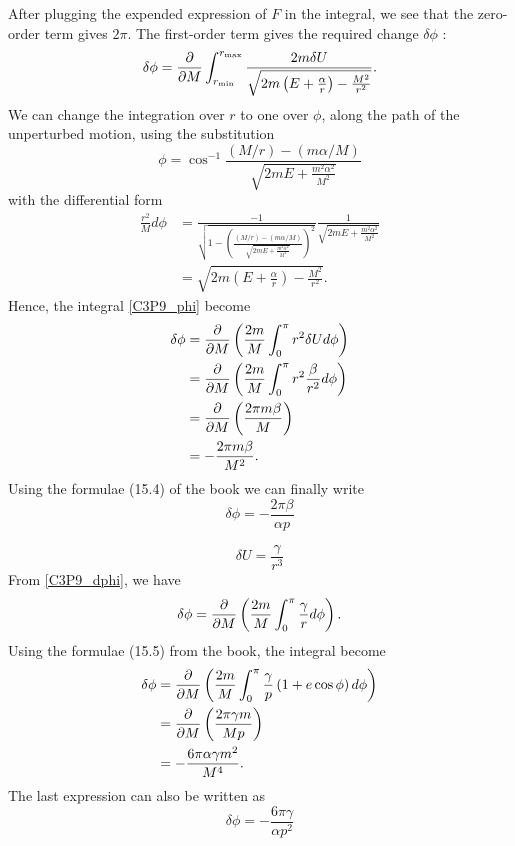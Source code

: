 \begin{subproblem}
{\begin{equation*}
\end{equation*}
After plugging the expended expression of $F$ in the integral, we see that the zero-order term gives $2\pi$. The first-order term gives the required change $\delta \phi$ :
\begin{equation} \label{C3P9_phi}
    \delta \phi = \frac{\partial }{\partial M}\int_{r_{\text{min}}}^{r_{\text{max}}} \frac{2m\delta U}{\sqrt{2m\left(E+\frac{\alpha}{r}\right)-\frac{M^2}{r^2}}}.
\end{equation}
We can change the integration over $r$ to one over $\phi$, along the path of the unperturbed motion, using the substitution
\begin{equation*}
    \phi = \cos^{-1}{\frac{(M/r)-(m\alpha/M)}{\sqrt{2mE+\frac{m^2\alpha^2}{M^2}}}}
\end{equation*}
with the differential form
\begin{align*}
    \frac{r^2}{M}d\phi &= \frac{-1}{\sqrt{1-\left(\frac{(M/r)-(m\alpha/M)}{\sqrt{2mE+\frac{m^2\alpha^2}{M^2}}}\right)^2}}\frac{1}{\sqrt{2mE+\frac{m^2\alpha^2}{M^2}}} \\
    &= \sqrt{2m\left(E+\frac{\alpha}{r}\right)-\frac{M^2}{r^2}}.
\end{align*}
Hence, the integral \eqref{C3P9_phi} become
\begin{align}
    \delta \phi &= \frac{\partial }{\partial M}\left( \frac{2m}{M} \int_0^\pi r^2\delta Ud\phi \right) \label{C3P9_dphi} \\
    &= \frac{\partial }{\partial M}\left( \frac{2m}{M} \int_0^\pi r^2\frac{\beta}{r^2}d\phi \right) \nonumber \\
    &= \frac{\partial }{\partial M}\left( \frac{2\pi m\beta}{M} \right) \nonumber  \\
    &= -\frac{2\pi m\beta}{M^2}. \nonumber
\end{align}
Using the formulae (15.4) of the book we can finally write
}
{
\begin{equation*}
    \delta \phi = -\frac{2\pi\beta}{\alpha p}
\end{equation*}
}
\end{subproblem}
\begin{subproblem}
{
\begin{equation*}
    \delta U = \frac{\gamma}{r^3}
\end{equation*}
}
{
From \eqref{C3P9_dphi}, we have
\begin{equation*}
     \delta \phi = \frac{\partial }{\partial M}\left( \frac{2m}{M} \int_0^\pi \frac{\gamma}{r}d\phi \right).
\end{equation*}
Using the formulae (15.5) from the book, the integral become
\begin{align*}
    \delta \phi &= \frac{\partial }{\partial M}\left( \frac{2m}{M} \int_0^\pi \frac{\gamma}{p}\left(1+e\cos\phi\right)d\phi \right) \\
    &= \frac{\partial }{\partial M}\left( \frac{2\pi\gamma m}{Mp} \right) \\
    &= -\frac{6\pi\alpha\gamma m^2}{M^4}.
\end{align*}
The last expression can also be written as
}
{
\begin{equation*}
    \delta \phi = -\frac{6\pi\gamma}{\alpha p^2}
\end{equation*}
}
\end{subproblem}